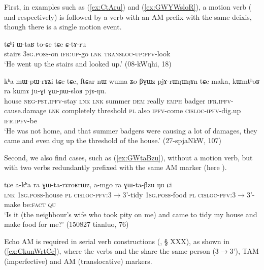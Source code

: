 First, in examples such as (\ref{ex:CtAru}) and (\ref{ex:GWYWsloR}), a motion verb ( and  respectively) is followed by a verb with an AM prefix with the same deixis, though there is a single motion event.

\begin{exe}
\ex \label{ex:CtAru}
\gll tɕʰi ɯ-taʁ to-ɕe tɕe ɕ-tɤ-ru   \\
stairs \textsc{3sg}.\textsc{poss}-on \textsc{ifr}:\textsc{up}-go \textsc{lnk}  \textsc{transloc}-\textsc{up}:\textsc{pfv}-look \\
\glt `He went up the stairs and looked up.'  (08-kWqhi, 18)
\end{exe}

\begin{exe}
\ex \label{ex:GWYWsloR}
\gll kʰa mɯ-pɯ-rɤʑi tɕe tɕe, ftɕar nɯ wuma ʑo βɣɯz pjɤ-rɯŋɯŋɤn tɕe maka,
kɯmtʰoʁ ra kɯnɤ ju-ɣi ɣɯ-ɲɯ-sloʁ pjɤ-ŋu. \\
house \textsc{neg}-\textsc{pst}.\textsc{ipfv}-stay \textsc{lnk} \textsc{lnk} summer \textsc{dem} really \textsc{emph} badger \textsc{ifr}.\textsc{ipfv}-cause.damage \textsc{lnk} completely threshold \textsc{pl} also \textsc{ipfv}-come \textsc{cisloc}-\textsc{ipfv}-dig.up \textsc{ifr}.\textsc{ipfv}-be \\
\glt `He was not home, and that summer badgers were causing a lot of damages, they came and even dug up  the threshold of the house.'  (27-spjaNkW, 107)
\end{exe}

Second, we also find cases, such as (\ref{ex:GWtaBzu}), without a motion verb, but with two verbs redundantly prefixed with the same AM marker (here ).

\begin{exe}
\ex \label{ex:GWtaBzu}
\gll  tɕe a-kʰa ra ɣɯ-ta-rɤroʁrɯz, 	a-mgo  ra ɣɯ-ta-βzu ŋu ɕi \\
\textsc{lnk} \textsc{1sg}.\textsc{poss}-house \textsc{pl} \textsc{cisloc}-\textsc{pfv}:3$\rightarrow$3'-tidy 
 \textsc{1sg}.\textsc{poss}-food \textsc{pl} \textsc{cisloc}-\textsc{pfv}:3$\rightarrow$3'-make be:\textsc{fact} \textsc{qu} \\ 
\glt `Is it (the neighbour's wife who took pity on me) and came to tidy my house and make food for me?'  (150827 tianluo, 76)
\end{exe}


Echo AM is required in serial verb constructions (\citealt[253-255]{jacques16complementation}, § XXX), as shown in (\ref{ex:CkunWrtCe}), where the verbs  and the  share the same person (3$\rightarrow$3'), TAM (imperfective) and AM (translocative) markers.

